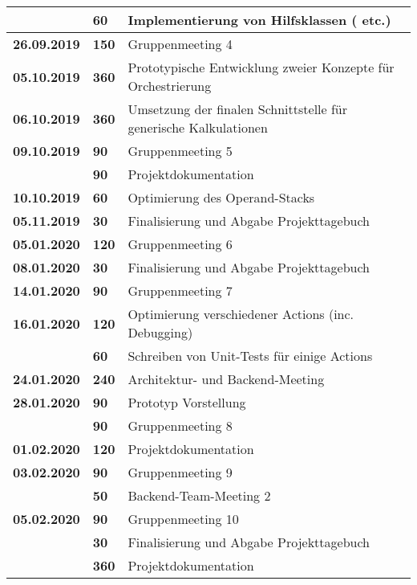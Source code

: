 {\begin{longtable}{|l|l|p{11cm}|}
			& \textbf{\hfill 60} & Implementierung von Hilfsklassen (\code{DoubleComparator} etc.)
		\\ \hline \textbf{26.09.2019}
			& \textbf{\hfill 150} & Gruppenmeeting 4
		\\ \hline \textbf{05.10.2019}
			& \textbf{\hfill 360} & Prototypische Entwicklung zweier Konzepte für Orchestrierung
		\\ \hline \textbf{06.10.2019}
			& \textbf{\hfill 360} & Umsetzung der finalen Schnittstelle für generische Kalkulationen
		\\ \hline \textbf{09.10.2019}
			& \textbf{\hfill 90} & Gruppenmeeting 5 \\\cline{2-3}
			& \textbf{\hfill 90} & Projektdokumentation
		\\ \hline \textbf{10.10.2019}
			& \textbf{\hfill 60} & Optimierung des Operand-Stacks
		\\ \hline \textbf{05.11.2019}
			& \textbf{\hfill 30} & Finalisierung und Abgabe Projekttagebuch
		\\ \hline \textbf{05.01.2020}
			& \textbf{\hfill 120} & Gruppenmeeting 6
		\\ \hline \textbf{08.01.2020}
			& \textbf{\hfill 30} & Finalisierung und Abgabe Projekttagebuch
		\\ \hline \textbf{14.01.2020}
			& \textbf{\hfill 90} & Gruppenmeeting 7
		\\ \hline \textbf{16.01.2020}
			& \textbf{\hfill 120} & Optimierung verschiedener Actions (inc. Debugging) \\\cline{2-3}
			& \textbf{\hfill 60} & Schreiben von Unit-Tests für einige Actions
		\\ \hline \textbf{24.01.2020}
			& \textbf{\hfill 240} & Architektur- und Backend-Meeting
		\\ \hline \textbf{28.01.2020}
			& \textbf{\hfill 90} & Prototyp Vorstellung \\\cline{2-3}
			& \textbf{\hfill 90} & Gruppenmeeting 8
		\\ \hline \textbf{01.02.2020}
			& \textbf{\hfill 120} & Projektdokumentation
		\\ \hline \textbf{03.02.2020}
			& \textbf{\hfill 90} & Gruppenmeeting 9 \\\cline{2-3}
			& \textbf{\hfill 50} & Backend-Team-Meeting 2
		\\ \hline \textbf{05.02.2020}
			& \textbf{\hfill 90} & Gruppenmeeting 10 \\\cline{2-3}
			& \textbf{\hfill 30} & Finalisierung und Abgabe Projekttagebuch \\\cline{2-3}
			& \textbf{\hfill 360} & Projektdokumentation \\
		\hline\hline
	\end{longtable}
}

